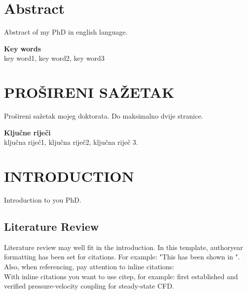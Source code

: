 \documentclass[12pt,a4paper]{article}
\begin{document}
\section*{Abstract}
\normalsize
\justifying


Abstract of my PhD in english language.\\





\justifying
\normalsize

\textbf{Key words}\\
key word1, key word2, key word3
\newpage
\section*{PROŠIRENI SAŽETAK}
Prošireni sažetak mojeg doktorata. Do maksimalno dvije stranice.\\
\justifying
\normalsize

\textbf{Ključne riječi}\\
ključna riječ1, ključna riječ2, ključna riječ 3.
\newpage

\setcounter{section}{0}
\tableofcontents
\newpage
\newpage


\pagestyle{fancy}

 
\section[Introduction]{INTRODUCTION} \label{Introduction}
Introduction to you PhD.

\subsection{Literature Review}\label{Literature Review}
Literature review may well fit in the introduction. In this template, authoryear formatting has been set for citations. For example: "This has been shown in \cite{patankar1980numerical}".\\

Also, when referencing, pay attention to inline citations:\\ 

With inline citations you want to use citep, for example: \citep{patankar1980numerical} first established and verified pressure-velocity coupling for steady-state \ac{CFD}.\\
\end{document}
